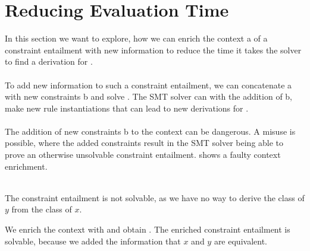 \section{Reducing Evaluation Time} %
In this section we want to explore,
how we can enrich the context \ovl a
of a constraint entailment 
with new information to reduce
the time it takes the solver to find a derivation for .
\\
\\
To add new information to such a constraint entailment,
we can concatenate \ovl a with new constraints \ovl b
and solve .
The SMT solver can with the addition of \ovl b,
make new rule instantiations that
can lead to new derivations for .\\
\\
The addition of new constraints \ovl b to the context
can be dangerous.
A misuse is possible, where the added constraints
result in the SMT solver being able to
prove an otherwise unsolvable constraint entailment.
 shows a faulty
context enrichment.

\begin{example}
\label{ex:enrich-context-misuse}\quad\\
The constraint entailment 
is not solvable,
as we have no way to derive the class of $y$ from the class of $x$.

We enrich the context with  and obtain
.
The enriched constraint entailment is solvable,
because we added the information that $x$ and $y$ are equivalent.
\end{example}

